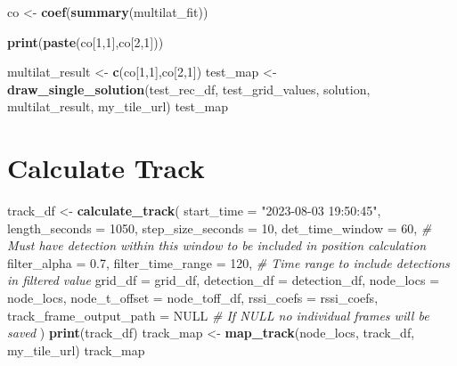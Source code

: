 \documentclass[
]{book}
\newenvironment{Shaded}{\begin{snugshade}}{\end{snugshade}}
\newcommand{\AttributeTok}[1]{\textcolor[rgb]{0.13,0.29,0.53}{#1}}
\newcommand{\CommentTok}[1]{\textcolor[rgb]{0.56,0.35,0.01}{\textit{#1}}}
\newcommand{\ConstantTok}[1]{\textcolor[rgb]{0.56,0.35,0.01}{#1}}
\newcommand{\DecValTok}[1]{\textcolor[rgb]{0.00,0.00,0.81}{#1}}
\newcommand{\FloatTok}[1]{\textcolor[rgb]{0.00,0.00,0.81}{#1}}
\newcommand{\FunctionTok}[1]{\textcolor[rgb]{0.13,0.29,0.53}{\textbf{#1}}}
\newcommand{\NormalTok}[1]{#1}
\newcommand{\OtherTok}[1]{\textcolor[rgb]{0.56,0.35,0.01}{#1}}
\newcommand{\StringTok}[1]{\textcolor[rgb]{0.31,0.60,0.02}{#1}}
\begin{document}
\begin{Shaded}
\begin{Highlighting}[]
\NormalTok{co }\OtherTok{\textless{}{-}} \FunctionTok{coef}\NormalTok{(}\FunctionTok{summary}\NormalTok{(multilat\_fit))}

\FunctionTok{print}\NormalTok{(}\FunctionTok{paste}\NormalTok{(co[}\DecValTok{1}\NormalTok{,}\DecValTok{1}\NormalTok{],co[}\DecValTok{2}\NormalTok{,}\DecValTok{1}\NormalTok{]))}

\NormalTok{multilat\_result }\OtherTok{\textless{}{-}} \FunctionTok{c}\NormalTok{(co[}\DecValTok{1}\NormalTok{,}\DecValTok{1}\NormalTok{],co[}\DecValTok{2}\NormalTok{,}\DecValTok{1}\NormalTok{])}
\NormalTok{test\_map }\OtherTok{\textless{}{-}} \FunctionTok{draw\_single\_solution}\NormalTok{(test\_rec\_df, }
\NormalTok{                                 test\_grid\_values, }
\NormalTok{                                 solution, }
\NormalTok{                                 multilat\_result, }
\NormalTok{                                 my\_tile\_url)}
\NormalTok{test\_map}
\end{Highlighting}
\end{Shaded}

\section{Calculate Track}\label{calculate-track}

\begin{Shaded}
\begin{Highlighting}[]
\NormalTok{track\_df }\OtherTok{\textless{}{-}} \FunctionTok{calculate\_track}\NormalTok{(}
  \AttributeTok{start\_time =} \StringTok{"2023{-}08{-}03 19:50:45"}\NormalTok{,}
  \AttributeTok{length\_seconds =} \DecValTok{1050}\NormalTok{,}
  \AttributeTok{step\_size\_seconds =} \DecValTok{10}\NormalTok{,}
  \AttributeTok{det\_time\_window =} \DecValTok{60}\NormalTok{, }\CommentTok{\# Must have detection within this window to be included in position calculation}
  \AttributeTok{filter\_alpha =} \FloatTok{0.7}\NormalTok{,}
  \AttributeTok{filter\_time\_range =} \DecValTok{120}\NormalTok{, }\CommentTok{\# Time range to include detections in filtered value}
  \AttributeTok{grid\_df =}\NormalTok{ grid\_df,}
  \AttributeTok{detection\_df =}\NormalTok{ detection\_df,}
  \AttributeTok{node\_locs =}\NormalTok{ node\_locs,}
  \AttributeTok{node\_t\_offset =}\NormalTok{ node\_toff\_df,}
  \AttributeTok{rssi\_coefs =}\NormalTok{ rssi\_coefs,}
  \AttributeTok{track\_frame\_output\_path =} \ConstantTok{NULL} \CommentTok{\# If NULL no individual frames will be saved}
\NormalTok{)}
\FunctionTok{print}\NormalTok{(track\_df)}
\NormalTok{track\_map }\OtherTok{\textless{}{-}} \FunctionTok{map\_track}\NormalTok{(node\_locs, track\_df, my\_tile\_url)}
\NormalTok{track\_map}
\end{Highlighting}
\end{Shaded}
\end{document}
